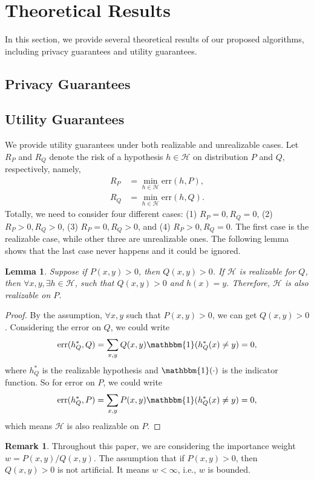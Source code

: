\documentclass{article}
\def\cH{\mathcal{H}}
\newtheorem{lemma}{Lemma}
\theoremstyle{definition}
\newtheorem*{remark}{Remark}
\begin{document}
\section{Theoretical Results}
In this section, we provide several theoretical results of our proposed algorithms, including privacy guarantees and utility guarantees.

\subsection{Privacy Guarantees}

\subsection{Utility Guarantees}
We provide utility guarantees under both realizable and unrealizable cases. Let $R_P$ and $R_Q$ denote the risk of a hypothesis $h\in \cH$ on distribution $P$ and $Q$, respectively, namely,
\begin{align*}
R_P &= \min_{h\in \cH} \text{err}(h,P),\\
R_Q &= \min_{h\in \cH} \text{err}(h,Q).
\end{align*}
Totally, we need to consider four different cases: (1) $R_P=0, R_Q=0$, (2) $R_P>0, R_Q>0$, (3) $R_P=0, R_Q>0$, and (4) $R_P>0, R_Q=0$. The first case is the realizable case, while other three are unrealizable ones. The following lemma shows that the last case never happens and it could be ignored.
\begin{lemma}
	Suppose if $P(x,y) > 0$, then $Q(x,y)>0$. If $\cH$ is realizable for $Q$, then $\forall x,y, \exists h\in \cH$, such that $Q(x,y)>0$ and $h(x)=y$. Therefore, $\cH$ is also realizable on $P$.
\end{lemma}
\begin{proof}
	By the assumption, $\forall x,y$ such that $P(x,y)>0$, we can get $Q(x,y)>0$. Considering the error on $Q$, we could write
	\begin{align*}
	\text{err}(h^*_Q,Q)=\sum_{x,y} Q(x,y)\mathbbm{1}(h^*_Q(x)\neq y)=0,
	\end{align*}
	where $h^*_Q$ is the realizable hypothesis and $\mathbbm{1}(\cdot)$ is the indicator function. So for error on $P$, we could write
	\begin{align*}
	\text{err}(h^*_Q,P)=\sum_{x,y} P(x,y)\mathbbm{1}(h^*_Q(x)\neq y)=0,
	\end{align*}
	which means $\cH$ is also realizable on $P$.
\end{proof}
\begin{remark}
	Throughout this paper, we are considering the importance weight $w=P(x,y)/Q(x,y)$. The assumption that if $P(x,y) > 0$, then $Q(x,y)>0$ is not artificial. It means $w<\infty$, i.e., $w$ is bounded.
\end{remark}
\end{document}
